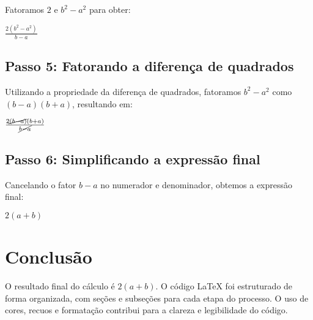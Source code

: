 \documentclass{article}
\begin{document}
Fatoramos $2$ e $b^2 - a^2$ para obter:

$\frac{2(b^2 - a^2)}{b - a}$

\subsection{Passo 5: Fatorando a diferença de quadrados}

Utilizando a propriedade da diferença de quadrados, fatoramos $b^2 - a^2$ como $(b - a)(b + a)$, resultando em:

$\frac{2 \cancel{(b - a)}(b + a)}{\cancel{b - a}}$

\subsection{Passo 6: Simplificando a expressão final}

Cancelando o fator $b - a$ no numerador e denominador, obtemos a expressão final:

$\boxed{2(a + b)}$

\section{Conclusão}

O resultado final do cálculo é $\boxed{2(a + b)}$. O código LaTeX foi estruturado de forma organizada, com seções e subseções para cada etapa do processo. O uso de cores, recuos e formatação contribui para a clareza e legibilidade do código.
\end{document}
